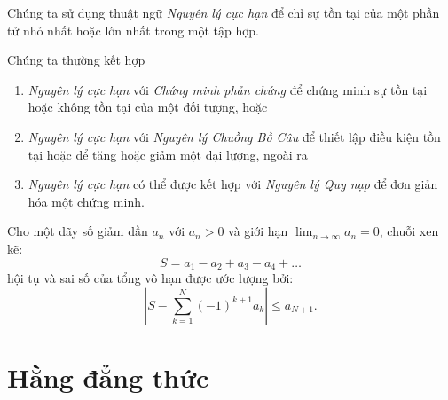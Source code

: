 \documentclass[../imo-training-open-book.tex]{subfiles}
\begin{document}
\begin{theorem*}
    \label{theorem:extremal-principle}
    Chúng ta sử dụng thuật ngữ \textit{Nguyên lý cực hạn} để chỉ sự tồn tại của một phần tử nhỏ nhất hoặc lớn nhất trong một tập hợp.

    Chúng ta thường kết hợp
    \begin{enumerate}[topsep=0pt, partopsep=0pt, itemsep=0pt]
        \item \textit{Nguyên lý cực hạn} với \textit{Chứng minh phản chứng} để chứng minh sự tồn tại hoặc không tồn tại của một đối tượng, hoặc
        \item \textit{Nguyên lý cực hạn} với \textit{Nguyên lý Chuồng Bồ Câu} để thiết lập điều kiện tồn tại hoặc để tăng hoặc giảm một đại lượng, ngoài ra
        \item \textit{Nguyên lý cực hạn} có thể được kết hợp với \textit{Nguyên lý Quy nạp} để đơn giản hóa một chứng minh.  
    \end{enumerate}
\end{theorem*}

\begin{theorem}
    \label{theorem:alternating-series-inequality}
    Cho một dãy số giảm dần \( a_n \) với \( a_n > 0 \) và giới hạn \(\lim_{n \to \infty} a_n = 0 \), chuỗi xen kẽ:
    \[
        S = a_1 - a_2 + a_3 - a_4 + \dots
    \]
    hội tụ và sai số của tổng vô hạn được ước lượng bởi:
    \[
        \left| S - \sum_{k=1}^{N} (-1)^{k+1} a_k \right| \leq a_{N+1}.
    \]
\end{theorem}

\newpage

\chapter{Hằng đẳng thức}

\newpage
\end{document}
